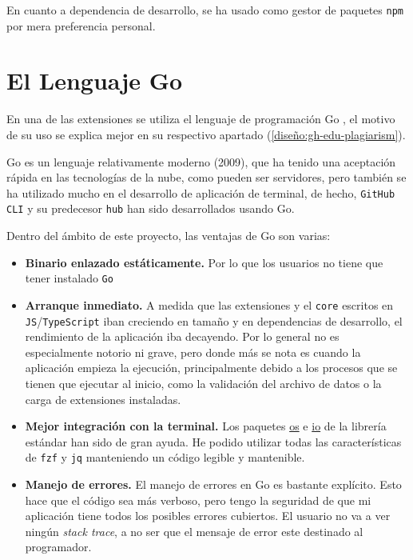 
En cuanto a dependencia de desarrollo, se ha usado como gestor de paquetes \verb|npm|\cite{npm} por mera preferencia personal.


\section{El Lenguaje Go} \label{go}
En una de las extensiones se utiliza el lenguaje de programación Go \cite{go}, el motivo de su uso se explica mejor en su respectivo apartado (\ref{diseño:gh-edu-plagiarism}).

Go es un lenguaje relativamente moderno (2009), que ha tenido una aceptación rápida en las tecnologías de la nube, como pueden ser servidores, pero también se ha utilizado mucho en el desarrollo de aplicación de terminal, de hecho, \verb|GitHub CLI| y su predecesor \verb|hub| han sido desarrollados usando Go.

Dentro del ámbito de este proyecto, las ventajas de Go son varias:
\begin{itemize}
    \item \textbf{Binario enlazado estáticamente.} Por lo que los usuarios no tiene que tener instalado \verb|Go|
    \item \textbf{Arranque inmediato.} A medida que las extensiones y el \verb|core| escritos en \verb|JS|/\verb|TypeScript| iban creciendo en tamaño y en dependencias de desarrollo, el rendimiento de la aplicación iba decayendo. Por lo general no es especialmente notorio ni grave, pero donde más se nota es cuando la aplicación empieza la ejecución, principalmente debido a los procesos que se tienen que ejecutar al inicio, como la validación del archivo de datos o la carga de extensiones instaladas.
    \item \textbf{Mejor integración con la terminal.} Los paquetes \href{https://pkg.go.dev/os}{os} e \href{https://pkg.go.dev/io}{io} de la librería estándar han sido de gran ayuda. He podido utilizar todas las características de \verb|fzf| y \verb|jq| manteniendo un código legible y mantenible.
    \item \textbf{Manejo de errores.} El manejo de errores en Go es bastante explícito. Esto hace que el código sea más verboso, pero tengo la seguridad de que mi aplicación tiene todos los posibles errores cubiertos. El usuario no va a ver ningún \emph{stack trace}, a no ser que el mensaje de error este destinado al programador.
\end{itemize}

